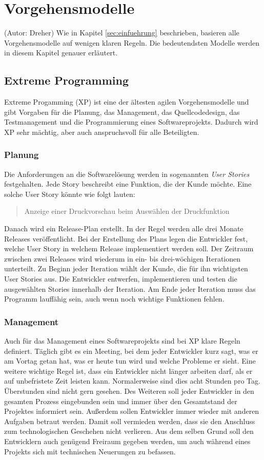 \section{Vorgehensmodelle}
(Autor: Dreher)
Wie in Kapitel \ref{sec:einfuehrung} beschrieben, basieren alle Vorgehensmodelle auf wenigen klaren Regeln. Die bedeutendsten Modelle werden in diesem Kapitel genauer erläutert.

\subsection{Extreme Programming}
Extreme Progamming (XP) ist eine der ältesten agilen Vorgehensmodelle und gibt Vorgaben für die Planung, das Management, das Quellcodedesign, das Testmanagement und die Programmierung eines Softwareprojekts. Dadurch wird XP sehr mächtig, aber auch anspruchsvoll für alle Beteiligten. \cite{bib:wolfRoock} \cite{bib:xp}

\subsubsection{Planung}
Die Anforderungen an die Softwarelösung werden in sogenannten \emph{User Stories} festgehalten. Jede Story beschreibt eine Funktion, die der Kunde möchte. Eine solche User Story könnte wie folgt lauten:
\begin{quote}
Anzeige einer Druckvorschau beim Auswählen der Druckfunktion
\end{quote}
Danach wird ein Release-Plan erstellt. In der Regel werden alle drei Monate Releases veröffentlicht. Bei der Erstellung des Plans legen die Entwickler fest, welche User Story in welchem Release implementiert werden soll. Der Zeitraum zwischen zwei Releases wird wiederum in ein- bis drei-wöchigen Iterationen unterteilt. Zu Beginn jeder Iteration wählt der Kunde, die für ihn wichtigsten User Stories aus. Die Entwickler entwerfen, implementieren und testen die ausgewählten Stories innerhalb der Iteration. Am Ende jeder Iteration muss das Programm lauffähig sein, auch wenn noch wichtige Funktionen fehlen. 

\subsubsection{Management}
Auch für das Management eines Softwareprojekts sind bei XP klare Regeln definiert. Täglich gibt es ein Meeting, bei dem jeder Entwickler kurz sagt, was er am Vortag getan hat, was er heute tun wird und welche Probleme er sieht. Eine weitere wichtige Regel ist, dass ein Entwickler nicht länger arbeiten darf, als er auf unbefristete Zeit leisten kann. Normalerweise sind dies acht Stunden pro Tag. Überstunden sind nicht gern gesehen. Des Weiteren soll jeder Entwickler in den gesamten Prozess eingebunden sein und immer über den Gesamtstand der Projektes informiert sein. Außerdem sollen Entwickler immer wieder mit anderen Aufgaben betraut werden. Damit soll vermieden werden, dass sie den Anschluss zum technologischen Geschehen nicht verlieren. Aus dem selben Grund soll den Entwicklern auch genügend Freiraum gegeben werden, um auch während eines Projekts sich mit technischen Neuerungen zu befassen.

